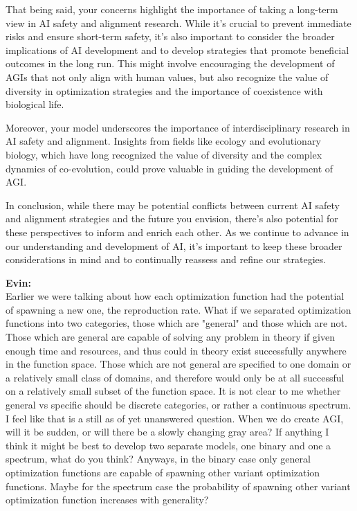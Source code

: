 \documentclass{article}[10pt]
\begin{document}
That being said, your concerns highlight the importance of taking a long-term view in AI safety and alignment research. 
While it's crucial to prevent immediate risks and ensure short-term safety, it's also important to consider the broader implications of AI development and to develop strategies that promote beneficial outcomes in the long run. 
This might involve encouraging the development of AGIs that not only align with human values, but also recognize the value of diversity in optimization strategies and the importance of coexistence with biological life. \par

Moreover, your model underscores the importance of interdisciplinary research in AI safety and alignment. 
Insights from fields like ecology and evolutionary biology, which have long recognized the value of diversity and the complex dynamics of co-evolution, could prove valuable in guiding the development of AGI. \par

In conclusion, while there may be potential conflicts between current AI safety and alignment strategies and the future you envision, there's also potential for these perspectives to inform and enrich each other. 
As we continue to advance in our understanding and development of AI, it's important to keep these broader considerations in mind and to continually reassess and refine our strategies.\par


\noindent \textbf{Evin:}\\
Earlier we were talking about how each optimization function had the potential of spawning a new one, the reproduction rate. 
What if we separated optimization functions into two categories, those which are "general" and those which are not. 
Those which are general are capable of solving any problem in theory if given enough time and resources, and thus could in theory exist successfully anywhere in the function space. 
Those which are not general are specified to one domain or a relatively small class of domains, and therefore would only be at all successful on a relatively small subset of the function space. 
It is not clear to me whether general vs specific should be discrete categories, or rather a continuous spectrum. 
I feel like that is a still as of yet unanswered question. When we do create AGI, will it be sudden, or will there be a slowly changing gray area? 
If anything I think it might be best to develop two separate models, one binary and one a spectrum, what do you think? 
Anyways, in the binary case only general optimization functions are capable of spawning other variant optimization functions. 
Maybe for the spectrum case the probability of spawning other variant optimization function increases with generality?\par
\end{document}
